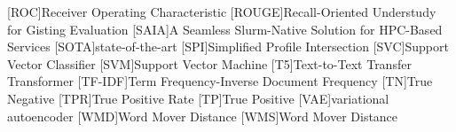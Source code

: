 \begin{acronym}[XXXXXXXXX]
    [ROC]{Receiver Operating Characteristic}
    [ROUGE]{Recall-Oriented Understudy for Gisting Evaluation}
    [SAIA]{A Seamless Slurm-Native Solution for HPC-Based Services}
    [SOTA]{state-of-the-art}
    [SPI]{Simplified Profile Intersection}
    [SVC]{Support Vector Classifier}
    [SVM]{Support Vector Machine}
    [T5]{Text-to-Text Transfer Transformer}
    [TF-IDF]{Term Frequency-Inverse Document Frequency}
    [TN]{True Negative}
    [TPR]{True Positive Rate}
    [TP]{True Positive}
    [VAE]{variational autoencoder}
    [WMD]{Word Mover Distance}
    [WMS]{Word Mover Distance}
\end{acronym}
